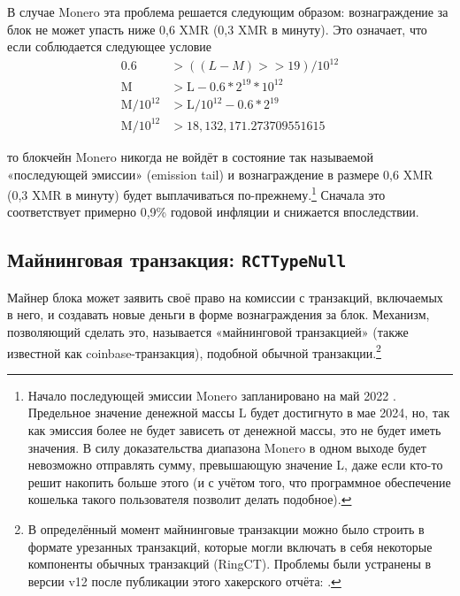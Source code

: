 В случае Monero эта проблема решается следующим образом: вознаграждение за блок не может упасть ниже 0,6 XMR (0,3 XMR в минуту). Это означает, что если соблюдается следующее условие\vspace{.175cm}
\begin{align*}
               0.6 &> ((L-M) >> 19)/10^{12} \\
        \textrm{M} &> \textrm{L} - 0.6*2^{19}*10^{12} \\
\textrm{M}/10^{12} &> \textrm{L}/10^{12} - 0.6*2^{19} \\
\textrm{M}/10^{12} &> 18,132,171.273709551615
\end{align*}

то блокчейн Monero никогда не войдёт в состояние так называемой «последующей эмиссии» (emission tail) и вознаграждение в размере 0,6 XMR (0,3 XMR в минуту) будет выплачиваться по-прежнему.\footnote{Начало последующей эмиссии Monero запланировано на май 2022 \cite{monero-tail-emission}. Предельное значение денежной массы L будет достигнуто в мае 2024, но, так как эмиссия более не будет зависеть от денежной массы, это не будет иметь значения. В силу доказательства диапазона Monero в одном выходе будет невозможно отправлять сумму, превышающую значение L, даже если кто-то решит накопить больше этого (и с учётом того, что программное обеспечение кошелька такого пользователя позволит делать подобное).} Сначала это соответствует примерно 0,9\% годовой инфляции и снижается впоследствии.


\subsection{Майнинговая транзакция: {\tt RCTTypeNull}}
\label{subsec:miner-transaction} %

Майнер блока может заявить своё право на комиссии с транзакций, включаемых в него, и создавать новые деньги в форме вознаграждения за блок. Механизм, позволяющий сделать это, называется «майнинговой транзакцией» (также известной как coinbase-транзакция), по\-добной обычной транзакции.\footnote{В определённый момент майнинговые транзакции можно было строить в формате урезанных транзакций, которые могли включать в себя некоторые компоненты обычных транзакций (RingCT). Проблемы были устранены в версии v12 после публикации этого хакерского отчёта: \cite{miner-tx-checks}.}


